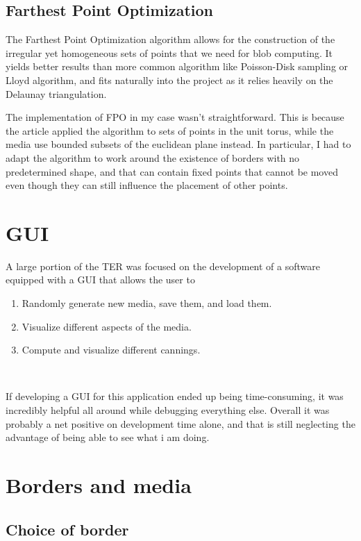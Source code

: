 \documentclass{article}
\begin{document}
\subsection{Farthest Point Optimization}

The Farthest Point Optimization algorithm \cite{FPO} allows for the construction of the irregular yet homogeneous sets of points that we need for blob computing. It yields better results than more common algorithm like Poisson-Disk sampling or Lloyd algorithm, and fits naturally into the project as it relies heavily on the Delaunay triangulation.

The implementation of FPO in my case wasn't straightforward. This is because the article applied the algorithm to sets of points in the unit torus, while the media use bounded subsets of the euclidean plane instead. In particular, I had to adapt the algorithm to work around the existence of borders with no predetermined shape, and that can contain fixed points that cannot be moved even though they can still influence the placement of other points.

\renewcommand{\thesection}{\arabic{section}}
\setcounter{section}{0}

\section{GUI}

A large portion of the TER was focused on the development of a software equipped with a GUI that allows the user to
\begin{enumerate}
	\item Randomly generate new media, save them, and load them.
	\item Visualize different aspects of the media.
	\item Compute and visualize different cannings.
\end{enumerate}
$ $

If developing a GUI for this application ended up being time-consuming, it was incredibly helpful all around while debugging everything else. Overall it was probably a net positive on development time alone, and that is still neglecting the advantage of being able to see what i am doing.

\section{Borders and media}

\subsection{Choice of border}
\end{document}
